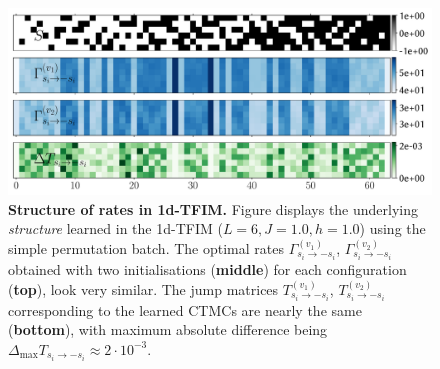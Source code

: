 \begin{figure}[t]
	\centering
	\includegraphics[width=\linewidth]{Chapter5/Figs/Vector/rate_structure.pdf}
	\caption[Structure of learned rates for 1d-TFIM]{\textbf{Structure of rates in 1d-TFIM.} Figure displays the underlying \emph{structure} learned in the 1d-TFIM ($L=6, J=1.0, h=1.0$) using the simple permutation batch. The optimal rates $\Gamma^{(v_1)}_{s_i \rightarrow -s_i}$, $\Gamma^{(v_2)}_{s_i \rightarrow -s_i}$ obtained with two initialisations (\textbf{middle}) for each configuration (\textbf{top}), look very similar. The jump matrices $T^{(v_1)}_{s_i \rightarrow -s_i}$, $T^{(v_2)}_{s_i \rightarrow -s_i}$ corresponding to the learned CTMCs are nearly the same (\textbf{bottom}), with maximum absolute difference being $\Delta_{\text{max}} T_{s_i \rightarrow -s_i} \approx 2\cdot10^{-3}$.}
	\label{fig:rate_structure}
\end{figure}

